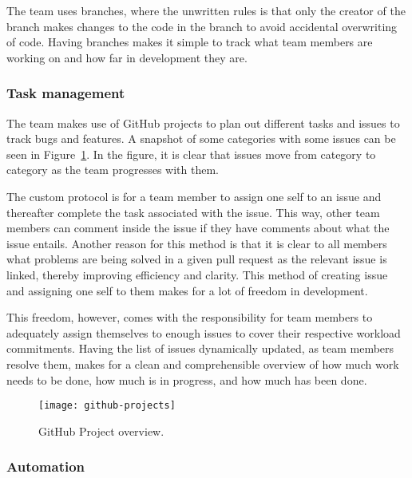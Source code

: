 The team uses branches, where the unwritten rules is that only the creator of the branch makes changes to the code in
the branch to avoid accidental overwriting of code.
Having branches makes it simple to track what team members are working on and how far in development they are.

\subsubsection{Task management}

The team makes use of GitHub projects to plan out different tasks and issues to track bugs and features.
A snapshot of some categories with some issues can be seen in Figure~\ref{fig:github-project}.
In the figure, it is clear that issues move from category to category as the team progresses with them.

The custom protocol is for a team member to assign one self to an issue and thereafter complete the task associated with
the issue.
This way, other team members can comment inside the issue if they have comments about what the issue entails.
Another reason for this method is that it is clear to all members what problems are being solved in a given pull request
as the relevant issue is linked, thereby improving efficiency and clarity.
This method of creating issue and assigning one self to them makes for a lot of freedom in development.

This freedom, however, comes with the responsibility for team members to adequately assign themselves to enough issues
to cover their respective workload commitments.
Having the list of issues dynamically updated, as team members resolve them, makes for a clean and
comprehensible overview of how much work needs to be done, how much is in progress, and how much has been done.

\begin{figure}[htb]
    \centering
    \texttt{[image: github-projects]}
    \caption{GitHub Project overview.}\label{fig:github-project}
\end{figure}


\subsubsection{Automation}

